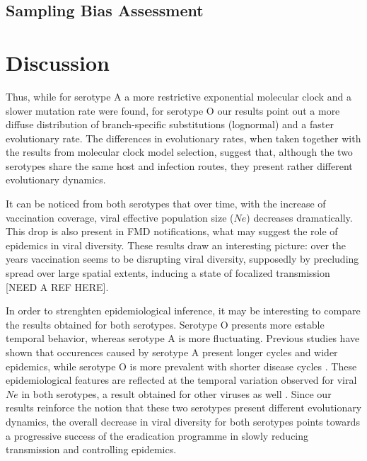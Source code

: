 \documentclass[10pt]{article}
\begin{document}
\subsection*{Sampling Bias Assessment}

\section*{Discussion}
Thus, while for serotype A a more restrictive exponential molecular clock and a slower mutation rate were found, for serotype O our results point out a more diffuse distribution of branch-specific substitutions (lognormal) and a  faster evolutionary rate. The differences in evolutionary rates, when taken together with the results from molecular clock model selection, suggest that, although the two serotypes share the same host and infection routes, they present rather different evolutionary dynamics. 

It can be noticed from both serotypes that over time, with the increase of vaccination coverage, viral effective population size ($Ne$) decreases dramatically. This drop is also present in FMD notifications, what may suggest the role of epidemics in viral diversity. These results draw an interesting picture: over the years vaccination seems to be disrupting viral diversity, supposedly by precluding spread over large spatial extents, inducing a state of focalized transmission [NEED A REF HERE].

In order to strenghten epidemiological inference, it may be interesting to compare the results obtained for both serotypes. Serotype O presents more estable temporal behavior, whereas serotype A is more fluctuating. Previous studies have shown that occurences caused by serotype A present longer cycles and wider epidemics, while serotype O is more prevalent with shorter disease cycles \cite{colombiatime}. These epidemiological features are reflected at the temporal variation observed for viral $Ne$ in both serotypes, a result obtained for other viruses as well \cite{Bennett2010,Pybus2003}. Since our results reinforce the notion that these two serotypes present different evolutionary dynamics, the overall decrease in viral diversity for both serotypes points towards a progressive success of the eradication programme in slowly reducing transmission and controlling epidemics.
\end{document}
